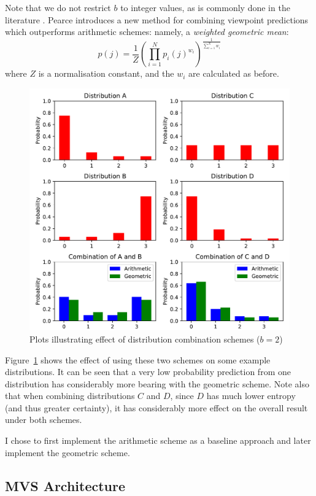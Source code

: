 \documentclass[12pt,a4paper,twoside,openright]{report}
\begin{document}
Note that we do not restrict $b$ to integer values, as is commonly done in the
literature \cite{whorley2013phd}. Pearce \cite{pearce2004improved} introduces a
new method for combining viewpoint predictions which outperforms arithmetic
schemes: namely, a \emph{weighted geometric mean}:
$$ p(j) = \frac{1}{Z} \left( \prod_{i = 1}^N p_i(j)^{w_i} \right)^{ \frac{1}{
\sum_{i = 1}^N w_i }} $$
where $Z$ is a normalisation constant, and the $w_i$ are calculated as before.

\begin{figure}[H]
\centering
\includegraphics[width=400pt]{figs/dist_comb.pdf}
\caption{Plots illustrating effect of distribution combination schemes ($b = 2$)}
\label{fig:dist-comb-plot}
\end{figure}

Figure~\ref{fig:dist-comb-plot} shows the effect of using these two schemes on
some example distributions. It can be seen that a very low probability
prediction from one distribution has considerably more bearing with the
geometric scheme. Note also that when combining distributions $C$ and $D$, since
$D$ has much lower entropy (and thus greater certainty), it has considerably
more effect on the overall result under both schemes.

I chose to first implement the arithmetic scheme as a baseline approach and
later implement the geometric scheme.

\subsection{MVS Architecture}\label{sec:mvs-arch}
\end{document}
